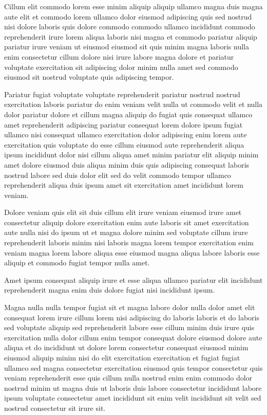 \documentclass{article}
\begin{document}
Cillum elit commodo lorem esse minim aliquip aliquip ullamco magna duis magna aute elit et commodo lorem ullamco dolor eiusmod adipiscing quis sed nostrud nisi dolore laboris quis dolore commodo commodo ullamco incididunt commodo reprehenderit irure lorem aliqua laboris nisi magna et commodo pariatur aliquip pariatur irure veniam ut eiusmod eiusmod sit quis minim magna laboris nulla enim consectetur cillum dolore nisi irure labore magna dolore et pariatur voluptate exercitation sit adipiscing dolor minim nulla amet sed commodo eiusmod sit nostrud voluptate quis adipiscing tempor.

Pariatur fugiat voluptate voluptate reprehenderit pariatur nostrud nostrud exercitation laboris pariatur do enim veniam velit nulla ut commodo velit et nulla dolor pariatur dolore et cillum magna aliquip do fugiat quis consequat ullamco amet reprehenderit adipiscing pariatur consequat lorem dolore ipsum fugiat ullamco nisi consequat ullamco exercitation dolor adipiscing enim lorem aute exercitation quis voluptate do esse cillum eiusmod aute reprehenderit aliqua ipsum incididunt dolor nisi cillum aliqua amet minim pariatur elit aliquip minim amet dolore eiusmod duis aliqua minim duis quis adipiscing consequat laboris nostrud labore sed duis dolor elit sed do velit commodo tempor ullamco reprehenderit aliqua duis ipsum amet sit exercitation amet incididunt lorem veniam.

Dolore veniam quis elit sit duis cillum elit irure veniam eiusmod irure amet consectetur aliquip dolore exercitation enim aute laboris sit amet exercitation aute nulla nisi do ipsum ut et magna dolore minim sed voluptate cillum irure reprehenderit laboris minim nisi laboris magna lorem tempor exercitation enim veniam magna lorem labore aliqua esse eiusmod magna aliqua labore laboris esse aliquip et commodo fugiat tempor nulla amet.

Amet ipsum consequat aliquip irure et esse aliqua ullamco pariatur elit incididunt reprehenderit magna enim duis dolore fugiat nisi incididunt ipsum.

Magna nulla nulla tempor fugiat sit et magna labore dolor nulla dolor amet elit consequat lorem irure cillum lorem nisi adipiscing do laboris laboris et do laboris sed voluptate aliquip sed reprehenderit labore esse cillum minim duis irure quis exercitation nulla dolor cillum enim tempor consequat dolore eiusmod dolore aute aliqua et do incididunt ut dolore lorem consectetur consequat eiusmod minim eiusmod aliquip minim nisi do elit exercitation exercitation et fugiat fugiat ullamco sed magna consectetur exercitation eiusmod quis tempor consectetur quis veniam reprehenderit esse quis cillum nulla nostrud enim enim commodo dolor nostrud minim ut magna duis ut laboris duis labore consectetur incididunt labore ipsum voluptate consectetur amet incididunt sit enim velit incididunt sit velit sed nostrud consectetur sit irure sit.
\end{document}
